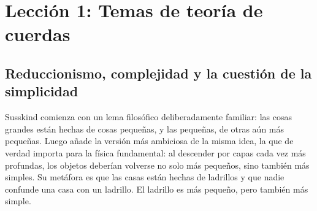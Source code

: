 \chapter{Lección 1: Temas de teoría de cuerdas}


\section{Reduccionismo, complejidad y la cuestión de la simplicidad}

Susskind comienza con un lema filosófico deliberadamente familiar: las cosas grandes están hechas de cosas pequeñas, y las pequeñas, de otras aún más pequeñas. Luego añade la versión más ambiciosa de la misma idea, la que de verdad importa para la física fundamental: al descender por capas cada vez más profundas, los objetos deberían volverse no solo más pequeños, sino también más simples. Su metáfora es que las casas están hechas de ladrillos y que nadie confunde una casa con un ladrillo. El ladrillo es más pequeño, pero también más simple.

